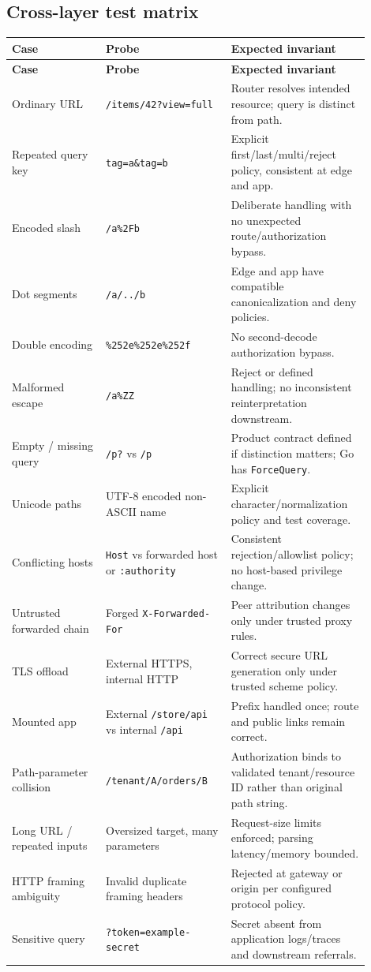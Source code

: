 \documentclass[10pt,letterpaper,oneside]{article}
\newcommand{\code}[1]{\texttt{#1}}
\begin{document}
\subsection{Cross-layer test matrix}
\footnotesize
\begin{longtable}{P{0.24\linewidth}P{0.32\linewidth}P{0.34\linewidth}}
\toprule\textbf{Case} & \textbf{Probe} & \textbf{Expected invariant}\\\midrule\endfirsthead
\toprule\textbf{Case} & \textbf{Probe} & \textbf{Expected invariant}\\\midrule\endhead
Ordinary URL & \code{/items/42?view=full} & Router resolves intended resource; query is distinct from path.\\
Repeated query key & \code{tag=a\&tag=b} & Explicit first/last/multi/reject policy, consistent at edge and app.\\
Encoded slash & \code{/a\%2Fb} & Deliberate handling with no unexpected route/authorization bypass.\\
Dot segments & \code{/a/../b} & Edge and app have compatible canonicalization and deny policies.\\
Double encoding & \code{\%252e\%252e\%252f} & No second-decode authorization bypass.\\
Malformed escape & \code{/a\%ZZ} & Reject or defined handling; no inconsistent reinterpretation downstream.\\
Empty / missing query & \code{/p?} vs \code{/p} & Product contract defined if distinction matters; Go has \code{ForceQuery}.\\
Unicode paths & UTF-8 encoded non-ASCII name & Explicit character/normalization policy and test coverage.\\
Conflicting hosts & \code{Host} vs forwarded host or \code{:authority} & Consistent rejection/allowlist policy; no host-based privilege change.\\
Untrusted forwarded chain & Forged \code{X-Forwarded-For} & Peer attribution changes only under trusted proxy rules.\\
TLS offload & External HTTPS, internal HTTP & Correct secure URL generation only under trusted scheme policy.\\
Mounted app & External \code{/store/api} vs internal \code{/api} & Prefix handled once; route and public links remain correct.\\
Path-parameter collision & \code{/tenant/A/orders/B} & Authorization binds to validated tenant/resource ID rather than original path string.\\
Long URL / repeated inputs & Oversized target, many parameters & Request-size limits enforced; parsing latency/memory bounded.\\
HTTP framing ambiguity & Invalid duplicate framing headers & Rejected at gateway or origin per configured protocol policy.\\
Sensitive query & \code{?token=example-secret} & Secret absent from application logs/traces and downstream referrals.\\
\bottomrule
\end{longtable}
\normalsize
\end{document}
